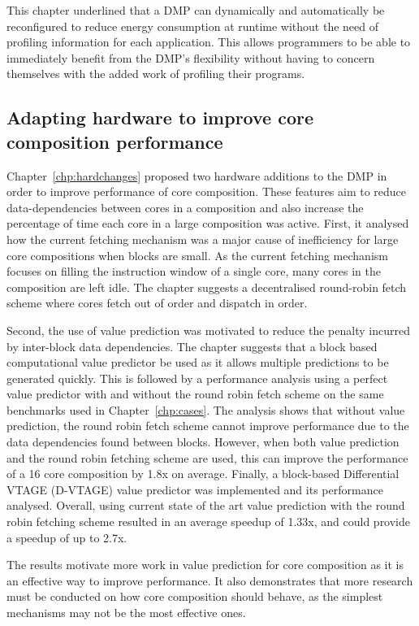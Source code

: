 This chapter underlined that a DMP can dynamically and automatically be reconfigured to reduce energy consumption at runtime without the need of profiling information for each application.
This allows programmers to be able to immediately benefit from the DMP's flexibility without having to concern themselves with the added work of profiling their programs.


\subsection{Adapting hardware to improve core composition performance}
Chapter~\ref{chp:hardchanges} proposed two hardware additions to the DMP in order to improve performance of core composition.
These features aim to reduce data-dependencies between cores in a composition and also increase the percentage of time each core in a large composition was active.
First, it analysed how the current fetching mechanism was a major cause of inefficiency for large core compositions when blocks are small.
As the current fetching mechanism focuses on filling the instruction window of a single core, many cores in the composition are left idle.
The chapter suggests a decentralised round-robin fetch scheme where cores fetch out of order and dispatch in order.

Second, the use of value prediction was motivated to reduce the penalty incurred by inter-block data dependencies.
The chapter suggests that a block based computational value predictor be used as it allows multiple predictions to be generated quickly.
This is followed by a performance analysis using a perfect value predictor with and without the round robin fetch scheme on the same benchmarks used in Chapter~\ref{chp:cases}.
The analysis shows that without value prediction, the round robin fetch scheme cannot improve performance due to the data dependencies found between blocks.
However, when both value prediction and the round robin fetching scheme are used, this can improve the performance of a 16 core composition by 1.8x on average.
Finally, a block-based Differential VTAGE (D-VTAGE) value predictor was implemented and its performance analysed.
Overall, using current state of the art value prediction with the round robin fetching scheme resulted in an average speedup of 1.33x, and could provide a speedup of up to 2.7x.

The results motivate more work in value prediction for core composition as it is an effective way to improve performance.
It also demonstrates that more research must be conducted on how core composition should behave, as the simplest mechanisms may not be the most effective ones.

